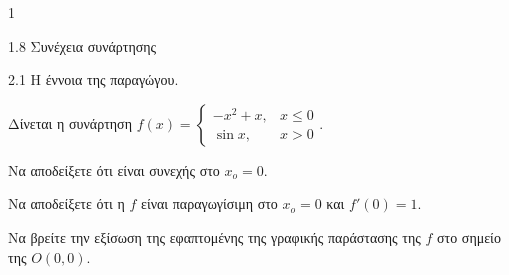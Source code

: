\begin{ylh}{1}
    \item 1.8 Συνέχεια συνάρτησης
    \item 2.1 Η έννοια της παραγώγου.
\end{ylh}
Δίνεται η συνάρτηση $f(x) = \begin{cases}
    -x^2 + x, & x \le 0 \\
    \sin x, & x > 0
\end{cases}$.
\begin{alist}
\item Να αποδείξετε ότι είναι συνεχής στο $x_o = 0$. 
\item Να αποδείξετε ότι η $f$ είναι παραγωγίσιμη στο $x_o = 0$ και $f'(0)=1$. 
\item Να βρείτε την εξίσωση της εφαπτομένης της γραφικής παράστασης της $f$ στο σημείο της $O(0, 0)$. 
\end{alist}